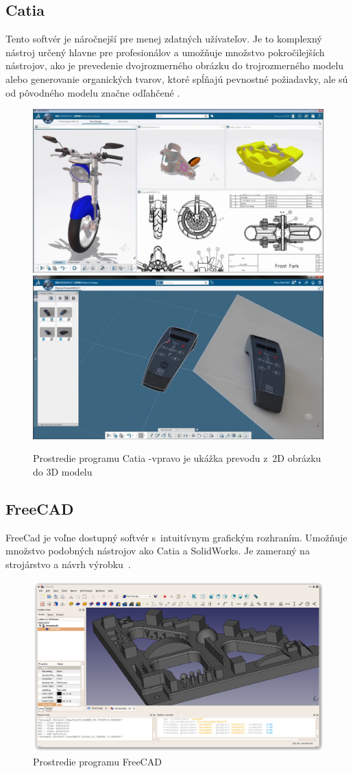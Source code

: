 \subsection*{Catia}
Tento softvér je náročnejší pre menej zdatných užívateľov. Je to komplexný nástroj určený hlavne pre profesionálov a umožňuje množstvo pokročilejších nástrojov, ako je prevedenie dvojrozmerného obrázku do trojrozmerného modelu alebo generovanie organických tvarov, ktoré spĺňajú pevnostné požiadavky, ale sú od pôvodného modelu značne odľahčené \cite{gaget_2018}.\nopagebreak
\begin{figure}[H]
    \centering
    \includegraphics[width = 0.49\linewidth]{obrazky-figures/programs/Catia.jpg}
    \includegraphics[width = 0.49\linewidth]{obrazky-figures/programs/Catia2.png}
    \caption{Prostredie programu Catia -vpravo je ukážka prevodu z~2D obrázku do 3D modelu\protect\footnotemark
    }
    \label{fig:Catia}
\end{figure}


\subsection*{FreeCAD}
FreeCad je voľne dostupný softvér s~intuitívnym grafickým rozhraním. Umožňuje množstvo podobných nástrojov ako Catia a SolidWorks. Je zameraný na strojárstvo a návrh výrobku~\cite{freecad_2015}.\nopagebreak
\begin{figure}[H]
    \centering
    \includegraphics[width = 0.5\linewidth]{obrazky-figures/programs/Freecad_default.jpg}
    \caption{Prostredie programu FreeCAD \cite{freecad_2015}}
    \label{fig:FreeCAD}
\end{figure}


